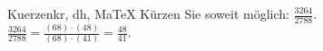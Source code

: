 \begin{MAufgabe}{Kuerzen}{kr, dh, MaTeX}
K\"urzen Sie soweit m\"oglich: $\frac{3264}{2788}$.\\ 
\ifLsg\MLoesung
\quad $\frac{3264}{2788}=\frac{(68)\cdot(48)}{(68)\cdot(41)}=\frac{48}{41}$.\else\relax\fi
 \end{MAufgabe}